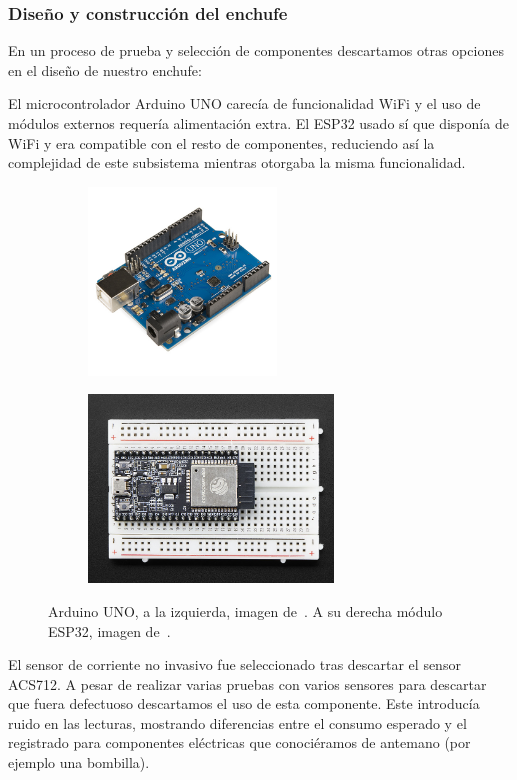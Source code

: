 \documentclass[a4paper,10pt]{article}
\begin{document}
\subsubsection{Diseño y construcción del enchufe}

En un proceso de prueba y selección de componentes descartamos otras
opciones en el diseño de nuestro enchufe:

El microcontrolador Arduino UNO carecía de funcionalidad WiFi y el uso de módulos
externos requería alimentación extra. El ESP32 usado sí que disponía
de WiFi y era compatible con el resto de componentes, reduciendo así
la complejidad de este subsistema mientras otorgaba la misma funcionalidad.

\begin{figure}[H]
  \centering
  \begin{subfigure}{0.5\textwidth}
    \includegraphics[width=0.9\linewidth, height=5cm]{img/arduino_uno.jpg} 
  \end{subfigure}
  \begin{subfigure}{0.49\textwidth}
    \includegraphics[width=1\linewidth, height=5cm]{img/esp32_image.jpg}
  \end{subfigure}  
  \caption{Arduino UNO, a la izquierda, imagen de~\cite{ArduinoR3}. A su derecha
    módulo ESP32, imagen de~\cite{industriesEspressifESP32Development2016}.}
\end{figure}

El sensor de corriente no invasivo fue seleccionado tras descartar el
sensor ACS712\cite{ACS712DatasheetPDF}. A pesar de realizar varias
pruebas con varios sensores para descartar que fuera defectuoso
descartamos el uso de esta componente. Este introducía ruido en las
lecturas, mostrando diferencias entre el consumo esperado y el
registrado para componentes eléctricas que conociéramos de antemano
(por ejemplo una bombilla).
\end{document}

